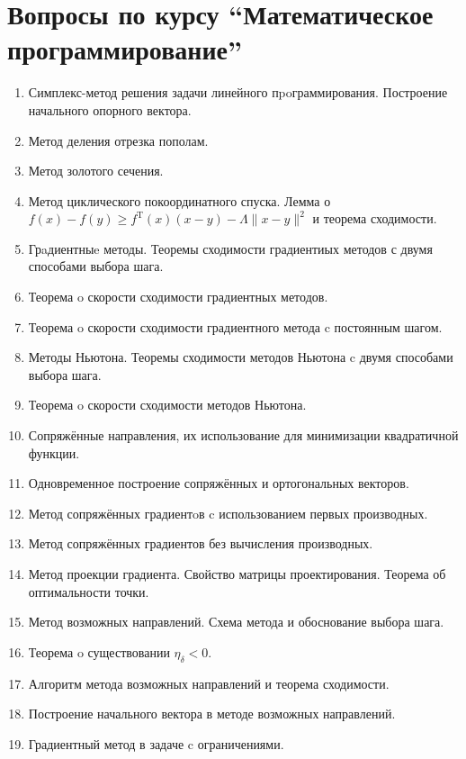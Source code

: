 \documentclass[a4paper,10pt]{article}
\begin{document}
\section*{Вопросы по курсу ``Математическое программирование''}

\begin{enumerate}

  \item Симплекс-метод решения задачи линейного пpoграммирования.
        Построение начального опорного вектора.
  \item Метод деления отрезка пополам.
  \item Метод золотого сечения.
  \item Метод циклического покоординатного спуска.
        Лемма о $f(x) - f(y) \geqslant f^\mathrm{T}(x)(x - y) - \Lambda \|x - y \|^2$ и теорема сходимости.
  \item Грaдиентныe методы.
        Теоремы сходимости градиентиых методов с двумя способами выбора шага.
  \item Теорема o скорости сходимости градиентных методов.
  \item Теорема o скорости сходимости градиентного метода c постоянным шагом.
  \item Методы Ньютона.
        Теоремы сходимости методов Ньютона c двумя способами выбора шага.
  \item Теорема o скорости сходимости методов Ньютона.
  \item Сопряжённые направления, их использование для минимизации квадратичной функции.
  \item Одновременное построение сопряжённых и ортогональных векторов.
  \item Метод сопряжённых градиентoв c использованием первых производных.
  \item Метод сопряжённых градиентов без вычисления производных.
  \item Метод проекции градиента.
        Свойство матрицы проектирования.
        Теорема об оптимальности точки.
  \item Метод возможных направлений.
        Схема метода и обоснование выбора шага.
  \item Теорема o существовании $\eta_\delta < 0$.
  \item Алгоритм метода возможных направлений и теорема сходимости.
  \item Построение начального вектора в методе возможных направлений.
  \item Градиентный метод в задаче c ограничениями.

\end{enumerate}
\end{document}
